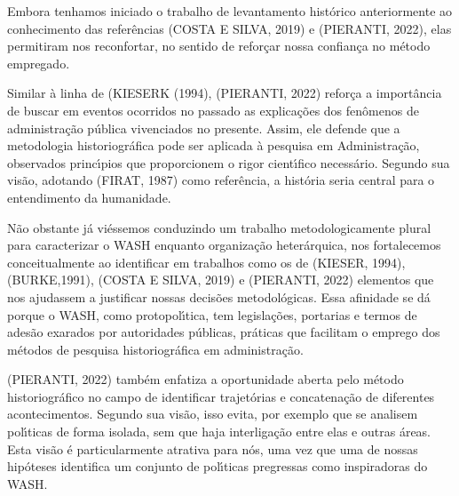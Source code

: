 \documentclass[
12pt,		%
openright,	%
twoside,  %
a4paper,			%
chapter=TITLE,		%
english,			%
french,				%
spanish,			%
brazil				%
]{USPSC-classe/USPSC}
\begin{document}
Embora tenhamos iniciado o trabalho de levantamento hist\'orico anteriormente ao conhecimento das refer\^encias (COSTA E SILVA, 2019) e (PIERANTI, 2022), elas permitiram nos reconfortar, no sentido de refor\c{c}ar nossa confian\c{c}a no m\'etodo empregado.









Similar \`a linha de (KIESERK (1994),  (PIERANTI, 2022) refor\c{c}a a import\^ancia de buscar em eventos ocorridos no passado as explica\c{c}\~oes dos fen\^omenos de administra\c{c}\~ao p\'ublica vivenciados no presente. Assim, ele defende que \textquotedbl a metodologia historiogr\'afica pode ser aplicada \`a pesquisa em Administra\c{c}\~ao\textquotedbl , observados princ\'{\i}pios que proporcionem o rigor cient\'{\i}fico necess\'ario. Segundo sua vis\~ao, adotando (FIRAT, 1987) como refer\^encia, a hist\'oria seria \textquotedbl central para o entendimento da humanidade\textquotedbl .









N\~ao obstante j\'a vi\'essemos conduzindo um trabalho metodologicamente plural para caracterizar o WASH enquanto organiza\c{c}\~ao heter\'arquica, nos fortalecemos conceitualmente ao identificar em trabalhos como os de (KIESER, 1994), (BURKE,1991), (COSTA E SILVA, 2019) e (PIERANTI, 2022) elementos que nos ajudassem a justificar nossas decis\~oes metodol\'ogicas. Essa afinidade se d\'a porque o WASH, como protopol\'{\i}tica, tem legisla\c{c}\~oes, portarias e termos de ades\~ao exarados por autoridades p\'ublicas, pr\'aticas que facilitam o emprego dos m\'etodos de pesquisa historiogr\'afica em administra\c{c}\~ao.









(PIERANTI, 2022) tamb\'em enfatiza a oportunidade aberta pelo m\'etodo historiogr\'afico  no campo de identificar trajet\'orias e concatena\c{c}\~ao de diferentes acontecimentos. Segundo sua vis\~ao, \textquotedbl isso evita, por exemplo que se analisem pol\'{\i}ticas de forma isolada, sem que haja interliga\c{c}\~ao entre elas e outras \'areas\textquotedbl . Esta vis\~ao \'e particularmente atrativa para n\'os, uma vez que uma de nossas hip\'oteses identifica um conjunto de pol\'{\i}ticas pregressas como inspiradoras do WASH.
\end{document}
